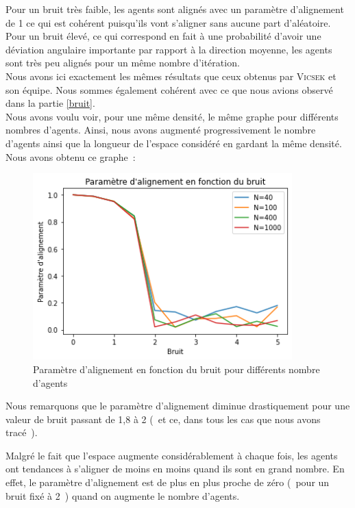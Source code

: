 \documentclass[french, a4paper, 12pt, openany]{report}
\begin{document}
	\newpage
	Pour un bruit très faible, les agents sont alignés avec un paramètre d'alignement de 1 ce qui est cohérent puisqu'ils vont s'aligner sans aucune part d'aléatoire. Pour un bruit élevé, ce qui correspond en fait à une probabilité d'avoir une déviation angulaire importante par rapport à la direction moyenne, les agents sont très peu alignés pour un même nombre d'itération. \\
	
	Nous avons ici exactement les mêmes résultats que ceux obtenus par \textsc{Vicsek} et son équipe. Nous sommes également cohérent avec ce que nous avions observé dans la partie \ref{bruit}.\\
	
	Nous avons voulu voir, pour une même densité, le même graphe pour différents nombres d'agents. Ainsi, nous avons augmenté progressivement le nombre d'agents ainsi que la longueur de l'espace considéré en gardant la même densité. Nous avons obtenu ce graphe~:
	
	\begin{figure}[!h]
		\centering
		\includegraphics[width=10cm]{images/comparatif_4.png}
		\caption{Paramètre d'alignement en fonction du bruit pour différents nombre d'agents}
		\label{param_bruit_2}
	\end{figure}
	
	 Nous remarquons que le paramètre d'alignement diminue drastiquement pour une valeur de bruit passant de 1,8 à 2 (~et ce, dans tous les cas que nous avons tracé~). 
	 
	 Malgré le fait que l'espace augmente considérablement à chaque fois, les agents ont tendances à s'aligner de moins en moins quand ils sont en grand nombre. En effet, le paramètre d'alignement est de plus en plus proche de zéro (~pour un bruit fixé à 2~) quand on augmente le nombre d'agents.
	 
\end{document}
